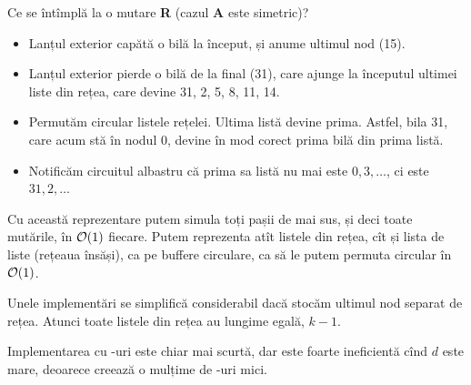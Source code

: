 \documentclass[../main.tex]{subfiles}
\begin{document}
Ce se întîmplă la o mutare \textbf{R} (cazul \textbf{A} este simetric)?

\begin{itemize}
  \item Lanțul exterior capătă o bilă la început, și anume ultimul nod (15).
  \item Lanțul exterior pierde o bilă de la final (31), care ajunge la începutul ultimei liste din rețea, care devine 31, 2, 5, 8, 11, 14.
  \item Permutăm circular listele rețelei. Ultima listă devine prima. Astfel, bila 31, care acum stă în nodul 0, devine în mod corect prima bilă din prima listă.
  \item Notificăm circuitul albastru că prima sa listă nu mai este $0, 3, \dots$, ci este $31, 2, \dots$
\end{itemize}

Cu această reprezentare putem simula toți pașii de mai sus, și deci toate mutările, în $\mathcal{O}(1)$ fiecare. Putem reprezenta atît listele din rețea, cît și lista de liste (rețeaua însăși), ca pe buffere circulare, ca să le putem permuta circular în $\mathcal{O}(1)$.

Unele implementări se simplifică considerabil dacă stocăm ultimul nod separat de rețea. Atunci toate listele din rețea au lungime egală, $k-1$.

Implementarea cu -uri este chiar mai scurtă, dar este foarte ineficientă cînd $d$ este mare, deoarece creează o mulțime de -uri mici.
\end{document}
